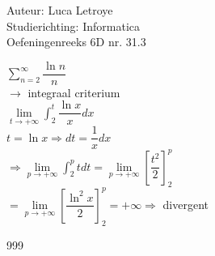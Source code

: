 \documentclass[a4paper]{article}
\newcommand{\dint}{\displaystyle\int}
\begin{document}
  
\noindent \large Auteur: Luca Letroye \\
\noindent \large Studierichting: Informatica\\
\noindent \large Oefeningenreeks 6D nr. 31.3

\medskip
\normalsize

$ \displaystyle\sum_{n=2}^{\infty} \dfrac{\ln n}{n} $\\

$\rightarrow $ integraal criterium\\

$\lim\limits_{t\rightarrow +\infty}\dint_2^{t} \dfrac{\ln x}{x}dx$\\

$t = \ln x \Rightarrow dt = \dfrac{1}{x}dx$\\

$\Rightarrow \lim\limits_{p\rightarrow +\infty}\dint_2^{p} t dt = \lim\limits_{p\rightarrow +\infty}\left[\dfrac{t^2}{2}\right]_2^p$\\

$ = \lim\limits_{p\rightarrow +\infty}\left[\dfrac{\ln^2 x}{2}\right]_2^p = +\infty \Rightarrow $ divergent\\






\begin{thebibliography}{999}
\end{thebibliography}
\end{document}
